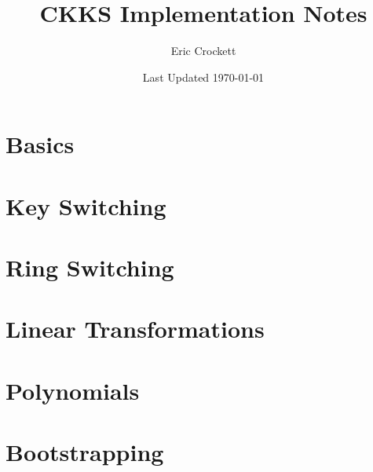 \documentclass[oneside]{book}
\title{CKKS Implementation Notes}
\author{Eric Crockett}
\date{Last Updated \today}
\newif\ifcompileasbook
\begin{document}
	\hypersetup{pageanchor=false}
	\compileasbooktrue
	\maketitle
	\hypersetup{pageanchor=true}
	\tableofcontents
	

	\chapter{Basics}
	
	
	\chapter{Key Switching}
	
	
	\chapter{Ring Switching}
	

	\chapter{Linear Transformations}
	\label{ch:lineartransforms}
	
	
	\chapter{Polynomials}
	\label{ch:polyeval}
	
	
	
	\chapter{Bootstrapping}
	\label{ch:bootstrapping}
	
\end{document}
